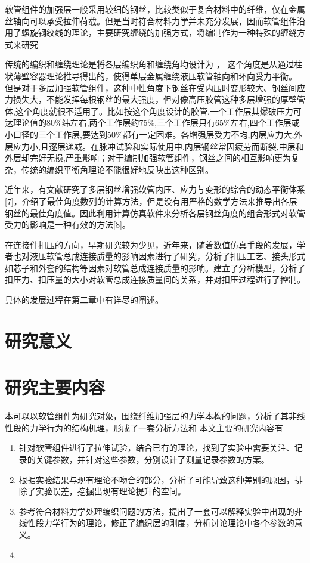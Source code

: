 软管组件的加强层一般采用较细的钢丝，比较类似于复合材料中的纤维，仅在金属丝轴向可以承受拉伸荷载。但是当时符合材料力学并未充分发展，因而软管组件沿用了螺旋钢绞线的理论，主要研究缠绕的加强方式\cite{Entwistle1977,Knapp1979}，将编制作为一种特殊的缠绕方式来研究\cite{Breig1988}

传统的编织和缠绕理论是将各层编织角和缠绕角均设计为 ，
这个角度是从通过柱状薄壁容器理论推导得出的，使得单层金属缠绕液压软管轴向和环向受力平衡。
但是对于多层加强软管组件，这种中性角度下钢丝在受内压时变形较大、钢丝间应力损失大\cite{Evans2002}，不能发挥每根钢丝的最大强度，但对像高压胶管这种多层增强的厚壁管体,这个角度就很不适用了。比如按这个角度设计的胶管,一个工作层其爆破压力可达理论值的80\%纬左右,两个工作层约75\%,三个工作层只有65\%左右,四个工作层或小口径的三个工作层,要达到50\%都有一定困难。各增强层受力不均,内层应力大,外层应力小,且逐层递减。在脉冲试验和实际使用中,内层钢丝常因疲劳而断裂,中层和外层却完好无损,严重影响；对于编制加强软管组件，钢丝之间的相互影响更为复杂，传统的编织平衡角理论不能很好地反映出这种区别。

近年来，有文献研究了多层钢丝增强软管内压、应力与变形的综合的动态平衡体系[7]，介绍了最佳角度数列的计算方法，但是没有用严格的数学方法来推导出各层钢丝的最佳角度值。因此利用计算仿真软件来分析各层钢丝角度的组合形式对软管受力的影响是一种有效的方法[8]。 

在连接件扣压的方向，早期研究较为少见，近年来，随着数值仿真手段的发展，学者也对液压软管总成连接质量的影响因素进行了研究，分析了扣压工艺、接头形式如芯子和外套的结构等因素对软管总成连接质量的影响。建立了分析模型，分析了扣压力、扣压量的大小对软管总成连接质量间的关系，并对扣压过程进行了控制。

具体的发展过程在第二章中有详尽的阐述。


\section{研究意义}

\section{研究主要内容}
本可以以软管组件为研究对象，围绕纤维加强层的力学本构的问题，分析了其非线性段的力学行为的结构机理，形成了一套分析方法和
本文主要的研究内容有
\begin{enumerate}
	\item 针对软管组件进行了拉伸试验，结合已有的理论，找到了实验中需要关注、记录的关键参数，并针对这些参数，分别设计了测量记录参数的方案。
	\item 根据实验结果与现有理论不吻合的部分，分析了可能导致这种差别的原因，排除了实验误差，挖掘出现有理论提升的空间。
	\item 参考符合材料力学处理编织问题的方法，提出了一套可以解释实验中出现的非线性段力学行为的理论，修正了编织层的刚度，分析讨论理论中各个参数的意义。
	\item 
\end{enumerate}

 
